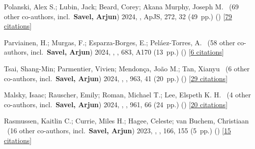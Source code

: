 \item[{\color{numcolor}\scriptsize28}] Polanski, Alex S.; Lubin, Jack; Beard, Corey; Akana Murphy, Joseph M. \etal{}\ ({69} other co-authors, incl.\ \textbf{Savel, Arjun}) 2024, , ApJS, {272}, 32 (49~pp.) () [\href{https://ui.adsabs.harvard.edu/abs/2024ApJS..272...32P}{79 citations}]

\item[{\color{numcolor}\scriptsize27}] Parviainen, H.; Murgas, F.; Esparza-Borges, E.; Pel{\'a}ez-Torres, A. \etal{}\ ({58} other co-authors, incl.\ \textbf{Savel, Arjun}) 2024, , \aanda, {683}, A170 (13~pp.) () [\href{https://ui.adsabs.harvard.edu/abs/2024A&A...683A.170P}{6 citations}]

\item[{\color{numcolor}\scriptsize26}] Tsai, Shang-Min; Parmentier, Vivien; Mendon{\c{c}}a, Jo{\~a}o M.; Tan, Xianyu \etal{}\ ({6} other co-authors, incl.\ \textbf{Savel, Arjun}) 2024, , \apj, {963}, 41 (20~pp.) () [\href{https://ui.adsabs.harvard.edu/abs/2024ApJ...963...41T}{29 citations}]

\item[{\color{numcolor}\scriptsize25}] Malsky, Isaac; Rauscher, Emily; Roman, Michael T.; Lee, Elspeth K. H. \etal{}\ ({4} other co-authors, incl.\ \textbf{Savel, Arjun}) 2024, , \apj, {961}, 66 (24~pp.) () [\href{https://ui.adsabs.harvard.edu/abs/2024ApJ...961...66M}{20 citations}]

\item[{\color{numcolor}\scriptsize24}] Rasmussen, Kaitlin C.; Currie, Miles H.; Hagee, Celeste; van Buchem, Christiaan \etal{}\ ({16} other co-authors, incl.\ \textbf{Savel, Arjun}) 2023, , \aj, {166}, 155 (5~pp.) () [\href{https://ui.adsabs.harvard.edu/abs/2023AJ....166..155R}{15 citations}]

